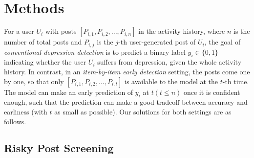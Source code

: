 \section{Methods}


For a user $U_i$ with posts $[P_{i,1}, P_{i,2}, ..., P_{i,n}]$ in the activity history, where $n$ is the number of total posts and $P_{i,j}$ is the $j$-th user-generated post of $U_i$, the goal of \textit{conventional depression detection} is to predict a binary label $y_i \in \{0, 1\}$ indicating whether the user $U_i$ suffers from depression, given the whole activity history. In contrast, in an \textit{item-by-item early detection} setting, the posts come one by one, so that only $[P_{i,1}, P_{i,2}, ..., P_{i,t}]$ is available to the model at the $t$-th time. The model can make an early prediction of $y_i$ at $t (t \leq n)$ once it is confident enough, such that the prediction can make a good tradeoff between accuracy and earliness (with $t$ as small as possible). Our solutions for both settings are as follows. 

\subsection{Risky Post Screening}
\label{sec:screening}


